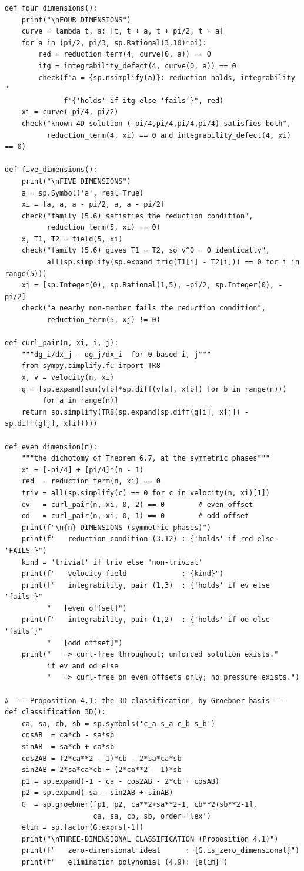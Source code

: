 \documentclass[11pt]{jfm}
\numberwithin{equation}{section}
\begin{document}
\begin{verbatim}
def four_dimensions():
    print("\nFOUR DIMENSIONS")
    curve = lambda t, a: [t, t + a, t + pi/2, t + a]
    for a in (pi/2, pi/3, sp.Rational(3,10)*pi):
        red = reduction_term(4, curve(0, a)) == 0
        itg = integrability_defect(4, curve(0, a)) == 0
        check(f"a = {sp.nsimplify(a)}: reduction holds, integrability "
              f"{'holds' if itg else 'fails'}", red)
    xi = curve(-pi/4, pi/2)
    check("known 4D solution (-pi/4,pi/4,pi/4,pi/4) satisfies both",
          reduction_term(4, xi) == 0 and integrability_defect(4, xi) == 0)

def five_dimensions():
    print("\nFIVE DIMENSIONS")
    a = sp.Symbol('a', real=True)
    xi = [a, a, a - pi/2, a, a - pi/2]
    check("family (5.6) satisfies the reduction condition",
          reduction_term(5, xi) == 0)
    x, T1, T2 = field(5, xi)
    check("family (5.6) gives T1 = T2, so v^0 = 0 identically",
          all(sp.simplify(sp.expand_trig(T1[i] - T2[i])) == 0 for i in range(5)))
    xj = [sp.Integer(0), sp.Rational(1,5), -pi/2, sp.Integer(0), -pi/2]
    check("a nearby non-member fails the reduction condition",
          reduction_term(5, xj) != 0)

def curl_pair(n, xi, i, j):
    """dg_i/dx_j - dg_j/dx_i  for 0-based i, j"""
    from sympy.simplify.fu import TR8
    x, v = velocity(n, xi)
    g = [sp.expand(sum(v[b]*sp.diff(v[a], x[b]) for b in range(n)))
         for a in range(n)]
    return sp.simplify(TR8(sp.expand(sp.diff(g[i], x[j]) - sp.diff(g[j], x[i]))))

def even_dimension(n):
    """the dichotomy of Theorem 6.7, at the symmetric phases"""
    xi = [-pi/4] + [pi/4]*(n - 1)
    red  = reduction_term(n, xi) == 0
    triv = all(sp.simplify(c) == 0 for c in velocity(n, xi)[1])
    ev   = curl_pair(n, xi, 0, 2) == 0        # even offset
    od   = curl_pair(n, xi, 0, 1) == 0        # odd offset
    print(f"\n{n} DIMENSIONS (symmetric phases)")
    print(f"   reduction condition (3.12) : {'holds' if red else 'FAILS'}")
    kind = 'trivial' if triv else 'non-trivial'
    print(f"   velocity field             : {kind}")
    print(f"   integrability, pair (1,3)  : {'holds' if ev else 'fails'}"
          "   [even offset]")
    print(f"   integrability, pair (1,2)  : {'holds' if od else 'fails'}"
          "   [odd offset]")
    print("   => curl-free throughout; unforced solution exists."
          if ev and od else
          "   => curl-free on even offsets only; no pressure exists.")

# --- Proposition 4.1: the 3D classification, by Groebner basis ---
def classification_3D():
    ca, sa, cb, sb = sp.symbols('c_a s_a c_b s_b')
    cosAB  = ca*cb - sa*sb
    sinAB  = sa*cb + ca*sb
    cos2AB = (2*ca**2 - 1)*cb - 2*sa*ca*sb
    sin2AB = 2*sa*ca*cb + (2*ca**2 - 1)*sb
    p1 = sp.expand(-1 - ca - cos2AB - 2*cb + cosAB)
    p2 = sp.expand(-sa - sin2AB + sinAB)
    G  = sp.groebner([p1, p2, ca**2+sa**2-1, cb**2+sb**2-1],
                     ca, sa, cb, sb, order='lex')
    elim = sp.factor(G.exprs[-1])
    print("\nTHREE-DIMENSIONAL CLASSIFICATION (Proposition 4.1)")
    print(f"   zero-dimensional ideal      : {G.is_zero_dimensional}")
    print(f"   elimination polynomial (4.9): {elim}")


\end{verbatim}
\end{document}
